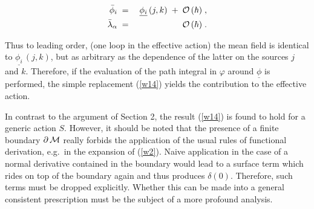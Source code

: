 \documentclass[a4paper,12pt]{article}
\def\ul{\underline}
\begin{document}
\begin{eqnarray}
{\bar\phi}_i \; & = & \; \ul{\phi_i} \, (j,k) \; + \; {\cal 
O}\, (\hbar) \; ,\label{w14} \\
\bar{\lambda}_\alpha \; & = & \; {\cal O}\,(\hbar) \; .
\label{w15}
\end{eqnarray}

Thus to leading order, (one loop in the effective action) 
the mean field is identical to $\ul{\phi_i}\, (j,k)$, but as 
arbitrary as the dependence of the latter on the sources 
$j$ and $k$. Therefore, if the evaluation of the path 
integral in $\varphi$ around $\ul{\phi}$  is performed, the 
simple replacement (\ref{w14}) yields the contribution to 
the effective action. 

In contrast to the argument of Section 2, the result 
(\ref{w14}) is found to hold for a generic action $S$. 
However, it should be noted that the presence of a finite 
boundary $\partial\, {\cal M}$ really forbids the 
application of the usual rules of functional derivation, 
e.g.\ in the expansion of (\ref{w2}). Naive application in 
the case of a normal derivative contained in the boundary 
would lead to a surface term which rides on top of the 
boundary again and thus produces $\delta (0)$. Therefore,  
such terms must be dropped explicitly. Whether this can be 
made into a general consistent prescription must be the 
subject of a more profound analysis. 



\end{document}
